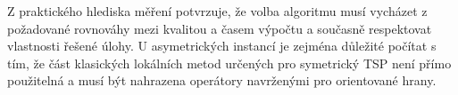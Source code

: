 Z praktického hlediska měření potvrzuje, že volba algoritmu musí vycházet z požadované rovnováhy mezi kvalitou a časem výpočtu a současně respektovat vlastnosti řešené úlohy. U asymetrických instancí je zejména důležité počítat s tím, že část klasických lokálních metod určených pro symetrický TSP není přímo použitelná a musí být nahrazena operátory navrženými pro orientované hrany.